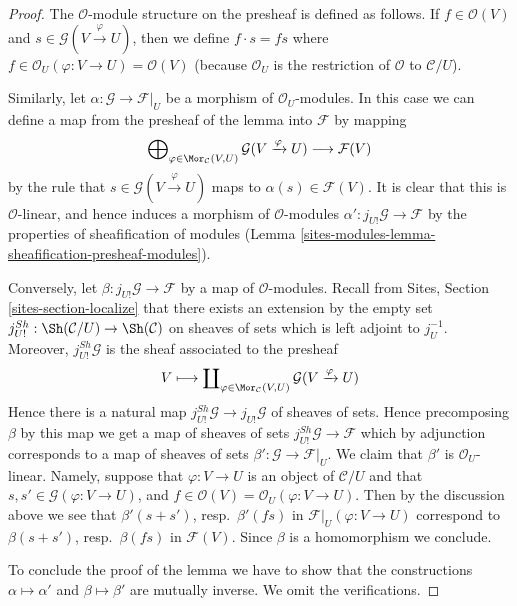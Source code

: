 \begin{proof}
The $\mathcal{O}$-module structure on the presheaf is defined as
follows. If $f \in \mathcal{O}(V)$ and
$s \in \mathcal{G}(V \xrightarrow{\varphi} U)$, then
we define $f \cdot s = fs$ where
$f \in \mathcal{O}_U(\varphi : V \to U) = \mathcal{O}(V)$
(because $\mathcal{O}_U$ is the restriction of $\mathcal{O}$ to
$\mathcal{C}/U$).

\medskip\noindent
Similarly, let $\alpha : \mathcal{G} \to \mathcal{F}|_U$ be a
morphism of $\mathcal{O}_U$-modules. In this case we can define
a map from the presheaf of the lemma into $\mathcal{F}$ by mapping
$$
\bigoplus\nolimits_{\varphi \in \Mor_\mathcal{C}(V, U)}
\mathcal{G}(V \xrightarrow{\varphi} U)
\longrightarrow
\mathcal{F}(V)
$$
by the rule that $s \in \mathcal{G}(V \xrightarrow{\varphi} U)$
maps to $\alpha(s) \in \mathcal{F}(V)$. It is clear that this is
$\mathcal{O}$-linear, and hence induces a morphism of
$\mathcal{O}$-modules $\alpha' : j_{U!}\mathcal{G} \to \mathcal{F}$
by the properties of sheafification of modules
(Lemma \ref{sites-modules-lemma-sheafification-presheaf-modules}).

\medskip\noindent
Conversely, let $\beta : j_{U!}\mathcal{G} \to \mathcal{F}$
by a map of $\mathcal{O}$-modules.
Recall from Sites, Section \ref{sites-section-localize}
that there exists an extension by the empty set
$j^{Sh}_{U!} : \Sh(\mathcal{C}/U) \to \Sh(\mathcal{C})$
on sheaves of sets which is left adjoint to $j_U^{-1}$.
Moreover, $j^{Sh}_{U!}\mathcal{G}$ is the sheaf associated to the presheaf
$$
V
\longmapsto
\coprod\nolimits_{\varphi \in \Mor_\mathcal{C}(V, U)}
\mathcal{G}(V \xrightarrow{\varphi} U)
$$
Hence there is a natural map
$j^{Sh}_{U!}\mathcal{G} \to j_{U!}\mathcal{G}$ of sheaves of sets.
Hence precomposing $\beta$ by this map we get a map of sheaves of sets
$j^{Sh}_{U!}\mathcal{G} \to \mathcal{F}$ which by adjunction corresponds
to a map of sheaves of sets $\beta' : \mathcal{G} \to \mathcal{F}|_U$.
We claim that $\beta'$ is $\mathcal{O}_U$-linear. Namely, suppose
that $\varphi : V \to U$ is an object of $\mathcal{C}/U$ and that
$s, s' \in \mathcal{G}(\varphi : V \to U)$, and
$f \in \mathcal{O}(V) = \mathcal{O}_U(\varphi : V \to U)$.
Then by the discussion above we see that
$\beta'(s + s')$, resp.\  $\beta'(fs)$ in $\mathcal{F}|_U(\varphi : V \to U)$
correspond to $\beta(s + s')$, resp.\ $\beta(fs)$ in
$\mathcal{F}(V)$. Since $\beta$ is a homomorphism we conclude.

\medskip\noindent
To conclude the proof of the lemma we have to show that the constructions
$\alpha \mapsto \alpha'$ and $\beta \mapsto \beta'$ are mutually inverse.
We omit the verifications.
\end{proof}

